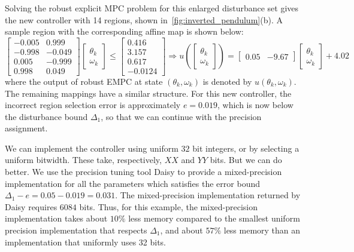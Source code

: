 %
Solving the robust explicit MPC problem for this enlarged disturbance set gives the new controller
with 14 regions, shown in~\autoref{fig:inverted_pendulum}(b).
A sample region with the corresponding affine map is shown below:
\begin{equation*}
\begin{bmatrix}
-0.005  &0.999\\
-0.998  &-0.049\\
0.005  &-0.999\\
0.998   &0.049
\end{bmatrix}
\begin{bmatrix}
\theta_k\\
\omega_k
\end{bmatrix}
%
\leq 
\begin{bmatrix}
0.416\\
3.157\\
0.617\\
-0.0124
\end{bmatrix}
\Rightarrow
u(\begin{bmatrix} \theta_k\\ \omega_k \end{bmatrix})=\begin{bmatrix}
0.05&-9.67
\end{bmatrix}\begin{bmatrix}\theta_k\\ \omega_k\end{bmatrix} +4.02%
\end{equation*}
where the output of robust EMPC at state $(\theta_k, \omega_k)$ is denoted by $u(\theta_k, \omega_k)$. 
The remaining mappings have a similar structure.
For this new controller, the incorrect region selection error is 
approximately $e = 0.019$, which is now below the disturbance bound $\Delta_1$,
so that we can continue with the precision assignment.


We can implement the controller using uniform $32$ bit integers, or by selecting a uniform bitwidth.
These take, respectively, $XX$ and $YY$ bits.
But we can do better.
We use the precision tuning tool Daisy \cite{Daisy} to provide a mixed-precision 
implementation for all the parameters which satisfies the error bound $\Delta_1  - e = 0.05 - 0.019 = 0.031$.
The mixed-precision implementation returned by Daisy requires $6084$ bits.
Thus, for this example, the mixed-precision implementation takes about $10\%$ less memory compared 
to the smallest uniform precision implementation that respects $\Delta_1$,
and about $57\%$ less memory than an implementation that uniformly uses 32 bits.

